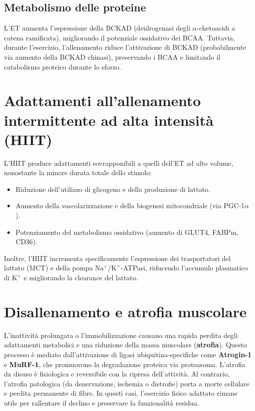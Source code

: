 \documentclass[12pt,a4paper]{report}
\begin{document}
\subsection{Metabolismo delle proteine}
L'ET aumenta l'espressione della BCKAD (deidrogenasi degli \(\alpha\)-chetoacidi a catena ramificata), migliorando il potenziale ossidativo dei BCAA. Tuttavia, durante l'esercizio, l'allenamento riduce l'attivazione di BCKAD (probabilmente via aumento della BCKAD chinasi), preservando i BCAA e limitando il catabolismo proteico durante lo sforzo.

\section{Adattamenti all'allenamento intermittente ad alta intensità (HIIT)}
L'HIIT produce adattamenti sovrapponibili a quelli dell'ET ad alto volume, nonostante la minore durata totale dello stimolo:
\begin{itemize}
\item Riduzione dell'utilizzo di glicogeno e della produzione di lattato.
\item Aumento della vascolarizzazione e della biogenesi mitocondriale (via PGC-1\(\alpha\)).
\item Potenziamento del metabolismo ossidativo (aumento di GLUT4, FABPm, CD36).
\end{itemize}
Inoltre, l'HIIT incrementa specificamente l'espressione dei trasportatori del lattato (MCT) e della pompa \(\mathrm{Na^+/K^+}\)-ATPasi, riducendo l'accumulo plasmatico di \(\mathrm{K^+}\) e migliorando la clearance del lattato.

\section{Disallenamento e atrofia muscolare}
L'inattività prolungata o l'immobilizzazione causano una rapida perdita degli adattamenti metabolici e una riduzione della massa muscolare (\textbf{atrofia}). Questo processo è mediato dall'attivazione di ligasi ubiquitina-specifiche come \textbf{Atrogin-1} e \textbf{MuRF-1}, che promuovono la degradazione proteica via proteasoma.
L'atrofia da disuso è fisiologica e reversibile con la ripresa dell'attività. Al contrario, l'atrofia patologica (da denervazione, ischemia o distrofie) porta a morte cellulare e perdita permanente di fibre. In questi casi, l'esercizio fisico adattato rimane utile per rallentare il declino e preservare la funzionalità residua.
\end{document}
